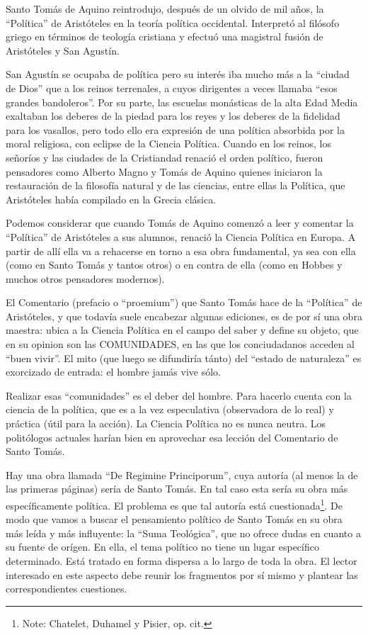 \documentclass[
]{book}
\begin{document}
Santo Tomás de Aquino reintrodujo, después de un olvido de mil años, la ``Política'' de Aristóteles en la teoría política occidental. Interpretó al filósofo griego en términos de teología cristiana y efectuó una magistral fusión de Aristóteles y San Agustín.

San Agustín se ocupaba de política pero su interés iba mucho más a la ``ciudad de Dios'' que a los reinos terrenales, a cuyos dirigentes a veces llamaba ``esos grandes bandoleros''. Por su parte, las escuelas monásticas de la alta Edad Media exaltaban los deberes de la piedad para los reyes y los deberes de la fidelidad para los vasallos, pero todo ello era expresión de una política absorbida por la moral religiosa, con eclipse de la Ciencia Política. Cuando en los reinos, los señoríos y las ciudades de la Cristiandad renació el orden político, fueron pensadores como Alberto Magno y Tomás de Aquino quienes iniciaron la restauración de la filosofía natural y de las ciencias, entre ellas la Política, que Aristóteles había compilado en la Grecia clásica.

Podemos considerar que cuando Tomás de Aquino comenzó a leer y comentar la ``Política'' de Aristóteles a sus alumnos, renació la Ciencia Política en Europa. A partir de allí ella va a rehacerse en torno a esa obra fundamental, ya sea con ella (como en Santo Tomás y tantos otros) o en contra de ella (como en Hobbes y muchos otros pensadores modernos).

El Comentario (prefacio o ``proemium'') que Santo Tomás hace de la ``Política'' de Aristóteles, y que todavía suele encabezar algunas ediciones, es de por sí una obra maestra: ubica a la Ciencia Política en el campo del saber y define su objeto, que en su opinion son las COMUNIDADES, en las que los conciudadanos acceden al ``buen vivir''. El mito (que luego se difundiría tánto) del ``estado de naturaleza'' es exorcizado de entrada: el hombre jamás vive sólo.

Realizar esas ``comunidades'' es el deber del hombre. Para hacerlo cuenta con la ciencia de la política, que es a la vez especulativa (observadora de lo real) y práctica (útil para la acción). La Ciencia Política no es nunca neutra. Los politólogos actuales harían bien en aprovechar esa lección del Comentario de Santo Tomás.

Hay una obra llamada ``De Regimine Principorum'', cuya autoría (al menos la de las primeras páginas) sería de Santo Tomás. En tal caso esta sería su obra más específicamente política. El problema es que tal autoría está cuestionada\footnote{Note: Chatelet, Duhamel y Pisier, op. cit.}. De modo que vamos a buscar el pensamiento político de Santo Tomás en su obra más leída y más influyente: la ``Suma Teológica'', que no ofrece dudas en cuanto a su fuente de orígen. En ella, el tema político no tiene un lugar específico determinado. Está tratado en forma dispersa a lo largo de toda la obra. El lector interesado en este aspecto debe reunir los fragmentos por sí mismo y plantear las correspondientes cuestiones.
\end{document}
